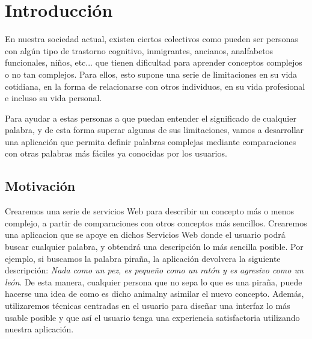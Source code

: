 \chapter{Introducción}
\label{cap:introduccion}


En nuestra sociedad actual, existen ciertos colectivos como pueden ser personas con algún tipo de trastorno cognitivo, inmigrantes, ancianos,  analfabetos funcionales, niños, etc... que tienen dificultad para aprender conceptos complejos o no tan complejos. Para ellos, esto supone una serie de limitaciones en su vida cotidiana, en la forma de relacionarse con otros individuos, en su vida profesional e incluso su vida personal.

Para ayudar a estas personas a que puedan entender el significado de cualquier palabra, y de esta forma superar algunas de sus limitaciones, vamos a desarrollar una aplicación que permita definir palabras complejas mediante comparaciones con otras palabras más fáciles ya conocidas por los usuarios. 

\section{Motivación}
Crearemos una serie de servicios Web para describir un concepto más o menos complejo, a partir de comparaciones con otros conceptos más sencillos. Crearemos una aplicacion que se apoye en dichos Servicios Web donde el usuario podrá buscar cualquier palabra, y obtendrá una descripción lo más sencilla posible. Por ejemplo, si buscamos la palabra piraña, la aplicación devolvera la siguiente descripción:  \textit{Nada como un pez, es pequeño como un ratón y es agresivo como un león}. De esta manera, cualquier persona que no sepa lo que es una piraña, puede hacerse una idea de como es dicho animalny asimilar el nuevo concepto. Además, utilizaremos técnicas centradas en el usuario para diseñar una interfaz lo más usable posible y que así el usuario tenga una experiencia satisfactoria utilizando nuestra aplicación.

